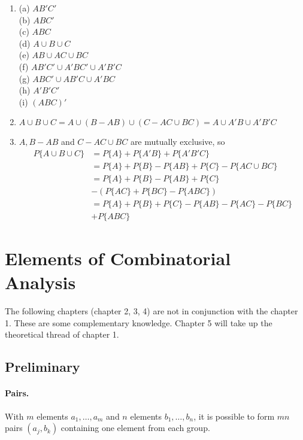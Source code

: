 \documentclass{article}
\numberwithin{equation}{subsection}
\begin{document}
\begin{enumerate}
			\item (a) $AB'C'$ \\ (b) $ABC'$ \\ (c) $ABC$ \\ (d) $A\cup B\cup C$ \\ (e) $AB\cup AC\cup BC$ \\ (f) $AB'C'\cup A'BC'\cup A'B'C$ \\ (g) $ABC'\cup AB'C\cup A'BC$ \\ (h) $A'B'C'$ \\ (i) $(ABC)'$
			\item $A\cup B\cup C = A\cup(B-AB)\cup(C-AC\cup BC) = A\cup A'B\cup A'B'C$
			\item $A, B-AB$ and $C-AC\cup BC$ are mutually exclusive, so 
			\begin{equation}
				\begin{aligned}
					P\{A\cup B\cup C\} &= P\{A\} + P\{A'B\} + P\{A'B'C\} \\ &= P\{A\} + P\{B\} - P\{AB\} + P\{C\} - P\{AC\cup BC\} \\ &= P\{A\} + P\{B\} - P\{AB\} + P\{C\} \\ & - (P\{AC\} + P\{BC\} - P\{ABC\}) \\ &= P\{A\} + P\{B\} + P\{C\} - P\{AB\} - P\{AC\} - P\{BC\} \\& + P\{ABC\}
				\end{aligned}
			\end{equation}
			\end{enumerate}
			
	\newpage
	\section{Elements of Combinatorial Analysis}
		\paragraph{} The following chapters (chapter 2, 3, 4) are not in conjunction with the chapter 1. These are some complementary knowledge. Chapter 5 will take up the theoretical thread of chapter 1.
		\subsection{Preliminary}
			\paragraph{Pairs.} With $m$ elements $a_1,\dots,a_m$ and $n$ elements $b_1,\dots,b_n$, it is possible to form $mn$ pairs $(a_j,b_k)$ containing one element from each group.
\end{document}
